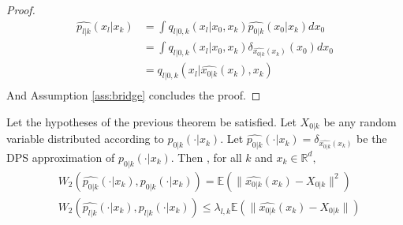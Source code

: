 \documentclass[12pt]{article}
\begin{document}
\begin{proof}
    \begin{align*}
    \hat{p_{l|k}}(x_l | x_k)  
    &= \int q_{l|0,k}(x_l | x_0, x_k) \hat{p_{0|k}}(x_0 | x_k) dx_0 \\
     &= \int q_{l|0,k}(x_l | x_0, x_k) \delta_{\hat{x_{0|k}}(x_k)}(x_0) dx_0 \\
        &= q_{l|0,k}(x_l | \hat{x_{0|k}}(x_k), x_k) \\
    \end{align*}
    And Assumption \ref{ass:bridge} concludes the proof.
\end{proof}

\begin{application}
    Let the hypotheses of the previous theorem be satisfied.
    Let $X_{0|k}$ be any random variable distributed according to $p_{0|k}(\cdot | x_k)$.
    Let $\hat{p_{0|k}}(\cdot | x_k) = \delta_{\hat{x_{0|k}}(x_k)}$ 
    be the DPS approximation of $p_{0|k}(\cdot | x_k)$.
    Then , for all $k$ and $x_k \in \mathbb{R}^d, $
    \begin{align*}
    & W_2(\hat{p_{0|k}}(\cdot | x_k), p_{0|k}(\cdot | x_k)) 
    = \mathbb{E}(\| \hat{x_{0|k}}(x_k) - X_{0|k} \|^2) \\
    & W_2(\hat{p_{l|k}}(\cdot | x_k), p_{l|k}(\cdot | x_k)) 
    \leq \lambda_{l,k} \mathbb{E}(\| \hat{x_{0|k}}(x_k) - X_{0|k} \|)
    \end{align*}
\end{application}
\end{document}
